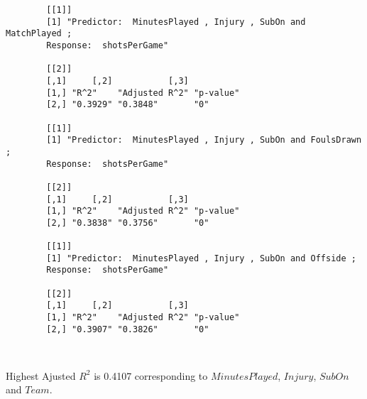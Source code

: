 \documentclass[12pt]{article}
\begin{document}
\begin{verbatim}
		[[1]]
		[1] "Predictor:  MinutesPlayed , Injury , SubOn and MatchPlayed ; 
		Response:  shotsPerGame"
		
		[[2]]
		[,1]     [,2]           [,3]     
		[1,] "R^2"    "Adjusted R^2" "p-value"
		[2,] "0.3929" "0.3848"       "0"      
		
		[[1]]
		[1] "Predictor:  MinutesPlayed , Injury , SubOn and FoulsDrawn ; 
		Response:  shotsPerGame"
		
		[[2]]
		[,1]     [,2]           [,3]     
		[1,] "R^2"    "Adjusted R^2" "p-value"
		[2,] "0.3838" "0.3756"       "0"      
		
		[[1]]
		[1] "Predictor:  MinutesPlayed , Injury , SubOn and Offside ; 
		Response:  shotsPerGame"
		
		[[2]]
		[,1]     [,2]           [,3]     
		[1,] "R^2"    "Adjusted R^2" "p-value"
		[2,] "0.3907" "0.3826"       "0"      
		
		
	\end{verbatim}
	Highest Ajusted $ R^2 $ is 0.4107 corresponding to $ MinutesPlayed $, $ Injury $, $ SubOn $ and $ Team $.
	
\end{document}
